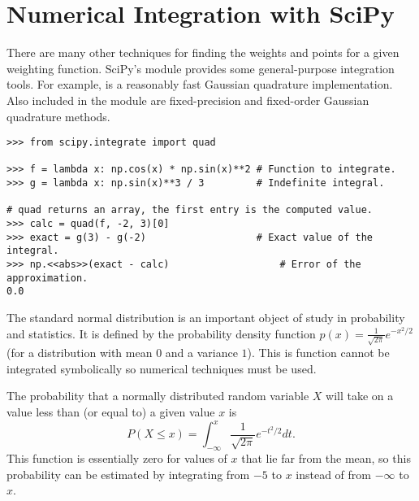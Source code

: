 \section*{Numerical Integration with SciPy} %

There are many other techniques for finding the weights and points for a given weighting function.
SciPy's  module provides some general-purpose integration tools.
For example,  is a reasonably fast Gaussian quadrature implementation.
Also included in the  module are fixed-precision and fixed-order Gaussian quadrature methods.
\begin{lstlisting}
>>> from scipy.integrate import quad

>>> f = lambda x: np.cos(x) * np.sin(x)**2 # Function to integrate.
>>> g = lambda x: np.sin(x)**3 / 3         # Indefinite integral.

# quad returns an array, the first entry is the computed value.
>>> calc = quad(f, -2, 3)[0]
>>> exact = g(3) - g(-2)                   # Exact value of the integral.
>>> np.<<abs>>(exact - calc)                   # Error of the approximation.
0.0
\end{lstlisting}

\begin{comment}
Another common hallmark of quadrature is that it can be used adaptively.
It is common in practice to refine the points of a quadrature estimate on an interval where a function is observed to be changing rapidly.
This allows for more accurate computation at a relatively low computational cost.
This is the approach used by the function \li{scipy.integrate.quad()}.
\end{comment}

The standard normal distribution is an important object of study in probability and statistics.
It is defined by the probability density function $p(x) = \frac{1}{\sqrt{2 \pi}} e^{-x^2/2}$ (for a distribution with mean $0$ and a variance $1$).
This is function cannot be integrated symbolically so numerical techniques must be used.

The probability that a normally distributed random variable $X$ will take on a value less than (or equal to) a given value $x$ is
\[
P(X \le x) = \int_{-\infty}^x \frac{1}{\sqrt{2 \pi}} e^{-t^2/2} dt.
\]
This function is essentially zero for values of $x$ that lie far from the mean, so this probability can be estimated by integrating from $-5$ to $x$ instead of from $-\infty$ to $x$.

